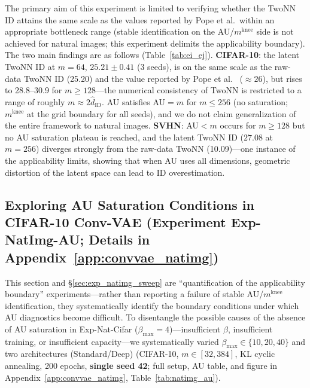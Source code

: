\documentclass[make,article,submit,pdftex,moreauthors]{Definitions/mdpi}
\newcommand{\mknee}{m^{\mathrm{knee}}}
\begin{document}
The primary aim of this experiment is limited to verifying whether the TwoNN ID
attains the same scale as the values reported by Pope et al.\ within an
appropriate bottleneck range (stable identification on the AU/$\mknee$ side is
not achieved for natural images; this experiment delimits the applicability
boundary).
The two main findings are as follows (Table~\ref{tab:ei_ej}).
\textbf{CIFAR-10}: the latent TwoNN ID at $m=64$, $25.21\pm0.41$ (3 seeds),
is on the same scale as the raw-data TwoNN ID (25.20) and the value reported by
Pope et al.~\cite{pope2021intrinsic} ($\approx 26$), but rises to 28.8--30.9
for $m \geq 128$---the numerical consistency of TwoNN is restricted to a range
of roughly $m \approx 2\hat{d}_\mathrm{ID}$.
AU satisfies AU$=m$ for $m \leq 256$ (no saturation; $\mknee$ at the grid
boundary for all seeds), and we do not claim generalization of the entire
framework to natural images.
\textbf{SVHN}: AU$<m$ occurs for $m \geq 128$ but no AU saturation plateau is
reached, and the latent TwoNN ID ($27.08$ at $m=256$) diverges strongly from
the raw-data TwoNN (10.09)---one instance of the applicability limits, showing
that when AU uses all dimensions, geometric distortion of the latent space can
lead to ID overestimation.

\subsection{Exploring AU Saturation Conditions in CIFAR-10 Conv-VAE (Experiment Exp-NatImg-AU; Details in Appendix~\ref{app:convvae_natimg})}\label{sec:exp_natimg_au}

This section and \S\ref{sec:exp_natimg_sweep} are ``quantification of the
applicability boundary'' experiments---rather than reporting a failure of
stable AU/$\mknee$ identification, they systematically identify the boundary
conditions under which AU diagnostics become difficult.
To disentangle the possible causes of the absence of AU saturation in
Exp-Nat-Cifar ($\beta_{\max}=4$)---insufficient $\beta$, insufficient
training, or insufficient capacity---we systematically varied
$\beta_{\max} \in \{10, 20, 40\}$ and two architectures (Standard/Deep)
(CIFAR-10, $m \in [32, 384]$, KL cyclic annealing, 200 epochs,
\textbf{single seed 42}; full setup, AU table, and figure in
Appendix~\ref{app:convvae_natimg}, Table~\ref{tab:natimg_au}).
\end{document}
